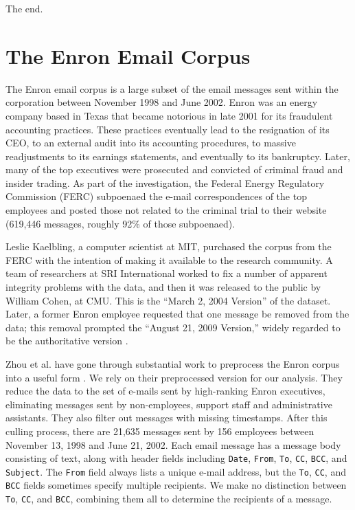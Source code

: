\documentclass[aoas,preprint]{imsart}
\begin{document}
The end.


\appendix

\section{The Enron Email Corpus}\label{S:enron-corpus}

The Enron email corpus is a large subset of the email messages sent within the
corporation between November 1998 and June 2002. Enron was an energy company
based in Texas that became notorious in late 2001 for its fraudulent
accounting practices. These practices eventually lead to the resignation of
its CEO, to an external audit into its accounting procedures, to massive
readjustments to its earnings statements, and eventually to its bankruptcy.
Later, many of the top executives were prosecuted and convicted of criminal
fraud and insider trading. As part of the investigation, the Federal Energy
Regulatory Commission (FERC) subpoenaed the e-mail correspondences of the top
employees and posted those not related to the criminal trial to their website
(619,446 messages, roughly 92\% of those subpoenaed).

Leslie Kaelbling, a computer scientist at MIT, purchased the corpus from the
FERC with the intention of making it available to the research community. A
team of researchers at SRI International worked to fix a number of apparent
integrity problems with the data, and then it was released to the public by
William Cohen, at CMU. This is the ``March 2, 2004 Version'' of the dataset.
Later, a former Enron employee requested that one message be removed from the
data; this removal prompted the ``August 21, 2009 Version,'' widely regarded
to be the authoritative version \cite{cohen2009enron}.

Zhou et al. have gone through substantial work to preprocess the Enron corpus
into a useful form \cite{zhou2007strategies}. We rely on their preprocessed
version for our analysis. They reduce the data to the set of e-mails sent by
high-ranking Enron executives, eliminating messages sent by non-employees,
support staff and administrative assistants. They also filter out messages
with missing timestamps. After this culling process, there are 21,635 messages
sent by 156 employees between November 13, 1998 and June 21, 2002. Each email
message has a message body consisting of text, along with header fields
including \texttt{Date}, \texttt{From}, \texttt{To}, \texttt{CC},
\texttt{BCC}, and \texttt{Subject}. The \texttt{From} field always lists a
unique e-mail address, but the \texttt{To}, \texttt{CC}, and \texttt{BCC}
fields sometimes specify multiple recipients. We make no distinction between
\texttt{To}, \texttt{CC}, and \texttt{BCC}, combining them all to determine
the recipients of a message.
\end{document}
